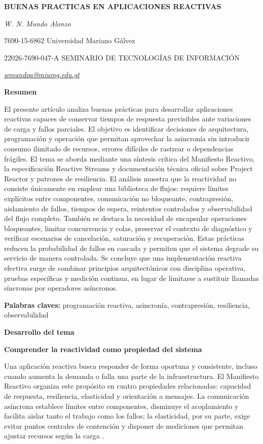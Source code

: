 \documentclass[12pt,letterpaper]{article}
\newcommand{\seccion}[1]{%
  \vspace{4pt}%
  {\noindent\textbf{#1}\par}%
  \vspace{1pt}%
}
\begin{document}
\justifying
\sloppy

\begin{center}
{\bfseries BUENAS PRACTICAS EN APLICACIONES REACTIVAS\par}
\vspace{4pt}
{\itshape W. N. Mundo Alonzo\par}
7690-15-6862 Universidad Mariano Gálvez\par
22026-7690-047-A SEMINARIO DE TECNOLOGÍAS DE INFORMACIÓN\par
{\itshape \href{mailto:wmundoa@miumg.edu.gt}{wmundoa@miumg.edu.gt}\par}
\end{center}

\seccion{Resumen}
El presente artículo analiza buenas prácticas para desarrollar aplicaciones reactivas capaces de conservar tiempos de respuesta previsibles ante variaciones de carga y fallos parciales. El objetivo es identificar decisiones de arquitectura, programación y operación que permitan aprovechar la asincronía sin introducir consumo ilimitado de recursos, errores difíciles de rastrear o dependencias frágiles. El tema se aborda mediante una síntesis crítica del Manifiesto Reactivo, la especificación Reactive Streams y documentación técnica oficial sobre Project Reactor y patrones de resiliencia. El análisis muestra que la reactividad no consiste únicamente en emplear una biblioteca de flujos: requiere límites explícitos entre componentes, comunicación no bloqueante, contrapresión, aislamiento de fallos, tiempos de espera, reintentos controlados y observabilidad del flujo completo. También se destaca la necesidad de encapsular operaciones bloqueantes, limitar concurrencia y colas, preservar el contexto de diagnóstico y verificar escenarios de cancelación, saturación y recuperación. Estas prácticas reducen la probabilidad de fallos en cascada y permiten que el sistema degrade su servicio de manera controlada. Se concluye que una implementación reactiva efectiva surge de combinar principios arquitectónicos con disciplina operativa, pruebas específicas y medición continua, en lugar de limitarse a sustituir llamadas síncronas por operadores asíncronos.

\noindent\textbf{Palabras claves:} programación reactiva, asincronía, contrapresión, resiliencia, observabilidad

\seccion{Desarrollo del tema}

\textbf{Comprender la reactividad como propiedad del sistema}\par
Una aplicación reactiva busca responder de forma oportuna y consistente, incluso cuando aumenta la demanda o falla una parte de la infraestructura. El Manifiesto Reactivo organiza este propósito en cuatro propiedades relacionadas: capacidad de respuesta, resiliencia, elasticidad y orientación a mensajes. La comunicación asíncrona establece límites entre componentes, disminuye el acoplamiento y facilita aislar tanto el trabajo como los fallos; la elasticidad, por su parte, exige evitar puntos centrales de contención y disponer de mediciones que permitan ajustar recursos según la carga \parencite{boner2014}.
\end{document}
